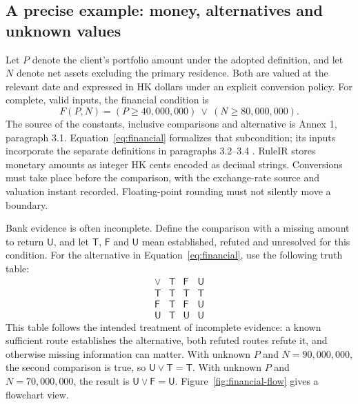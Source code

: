 \documentclass[12pt,a4paper,oneside,openany]{book}
\newcommand{\True}{\mathsf{T}}
\newcommand{\False}{\mathsf{F}}
\newcommand{\Unknown}{\mathsf{U}}
\begin{document}
\subsection{A precise example: money, alternatives and unknown values}
\label{merge:P-03-product:03}

\label{sec:semantics}

Let $P$ denote the client's portfolio amount under the adopted definition, and
let $N$ denote net assets excluding the primary residence. Both are valued at the
relevant date and expressed in HK dollars under an explicit conversion policy.
For complete, valid inputs, the financial condition is
\begin{equation}
 F(P,N)=(P\geq 40{,}000{,}000)\ \lor\ (N\geq 80{,}000{,}000).
 \label{eq:financial}
\end{equation}
The source of the constants, inclusive comparisons and alternative is Annex 1,
paragraph 3.1. Equation~\eqref{eq:financial} formalizes that subcondition; its
inputs incorporate the separate definitions in paragraphs 3.2--3.4
\citep{sfcspiannex1}. RuleIR stores monetary amounts as
integer HK cents encoded as decimal strings. Conversions must take place
before the comparison, with the exchange-rate source and valuation instant
recorded. Floating-point rounding must not silently move a boundary.

Bank evidence is often incomplete. Define the comparison with a missing amount
to return $\Unknown$, and let $\True$, $\False$ and $\Unknown$ mean established,
refuted and unresolved for this condition. For the alternative in
Equation~\eqref{eq:financial}, use the following truth table:
\begin{equation}
\begin{array}{c|ccc}
\lor & \True & \False & \Unknown\\\hline
\True & \True & \True & \True\\
\False & \True & \False & \Unknown\\
\Unknown & \True & \Unknown & \Unknown
\end{array}
\label{eq:or}
\end{equation}
This table follows the intended treatment of incomplete evidence: a known
sufficient route establishes the alternative, both refuted routes refute it,
and otherwise missing information can matter. With unknown $P$ and
$N=90{,}000{,}000$, the second comparison is true, so
$\Unknown\lor\True=\True$. With unknown $P$ and $N=70{,}000{,}000$, the result
is $\Unknown\lor\False=\Unknown$. Figure~\ref{fig:financial-flow} gives a
flowchart view.
\end{document}
